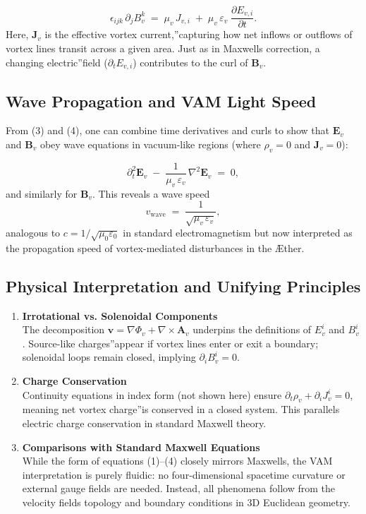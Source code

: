 \[
    \epsilon_{ijk}\,\partial_j B_{v}^k
    \;=\;
    \mu_v\,J_{v,i}
    \;+\;
    \mu_v\,\varepsilon_v\;\frac{\partial E_{v,i}}{\partial t}.
    \tag{4}
\]
Here, \(\mathbf{J}_v\) is the effective \grqq vortex current,\textquotedblright capturing how net inflows or outflows of vortex lines transit across a given area. Just as in Maxwell\rqs s correction, a changing \grqq electric\textquotedblright field (\(\partial_t E_{v,i}\)) contributes to the curl of \(\mathbf{B}_v\).

\subsection{Wave Propagation and VAM Light Speed}

From (3) and (4), one can combine time derivatives and curls to show that \(\mathbf{E}_v\) and \(\mathbf{B}_v\) obey wave equations in vacuum-like regions (where \(\rho_v=0\) and \(\mathbf{J}_v=0\)):

\[
    \partial_t^2 \mathbf{E}_v
    \;-\;
    \frac{1}{\mu_v\,\varepsilon_v}\,
    \nabla^2 \mathbf{E}_v
    \;=\; 0,
\]
and similarly for \(\mathbf{B}_v\). This reveals a wave speed
\[
    v_{\mathrm{wave}}
    \;=\;
    \frac{1}{\sqrt{\mu_v\,\varepsilon_v}},
\]
analogous to \(c = 1/\sqrt{\mu_0\varepsilon_0}\) in standard electromagnetism but now interpreted as the propagation speed of vortex-mediated disturbances in the Æther.

\subsection{Physical Interpretation and Unifying Principles}

\begin{enumerate}
    \item \textbf{Irrotational vs. Solenoidal Components} \\
    The decomposition \(\mathbf{v} = \nabla \Phi_v + \nabla\times \mathbf{A}_v\) underpins the definitions of \(E_{v}^i\) and \(B_{v}^i\). Source-like \grqq charges\textquotedblright appear if vortex lines enter or exit a boundary; solenoidal loops remain closed, implying \(\partial_i B_{v}^i=0\).
    \item \textbf{Charge Conservation} \\
    Continuity equations in index form (not shown here) ensure \(\partial_t \rho_v + \partial_i J_{v}^i = 0\), meaning net vortex \grqq charge\textquotedblright is conserved in a closed system. This parallels electric charge conservation in standard Maxwell theory.
    \item \textbf{Comparisons with Standard Maxwell Equations} \\
    While the form of equations (1)--(4) closely mirrors Maxwell\rqs s, the VAM interpretation is purely fluidic: no four-dimensional spacetime curvature or external gauge fields are needed. Instead, all phenomena follow from the velocity field\rqs s topology and boundary conditions in 3D Euclidean geometry.
\end{enumerate}

